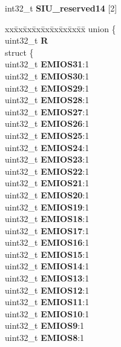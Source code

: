\begin{DoxyCompactItemize}
\begin{tabbing}
\end{tabbing}\item 
\mbox{\label{structSIU__tag_afd5b7a27271b575a1bd545b7b671dc21}} 
int32\+\_\+t {\bfseries S\+I\+U\+\_\+reserved14} \mbox{[}2\mbox{]}
\item 
\mbox{\label{structSIU__tag_aaf48f75214114a29451a5e53c22f54a5}} 
\begin{tabbing}
xx\=xx\=xx\=xx\=xx\=xx\=xx\=xx\=xx\=\kill
union \{\\
\>uint32\_t {\bfseries R}\\
\>struct \{\\
\>\>uint32\_t {\bfseries EMIOS31}:1\\
\>\>uint32\_t {\bfseries EMIOS30}:1\\
\>\>uint32\_t {\bfseries EMIOS29}:1\\
\>\>uint32\_t {\bfseries EMIOS28}:1\\
\>\>uint32\_t {\bfseries EMIOS27}:1\\
\>\>uint32\_t {\bfseries EMIOS26}:1\\
\>\>uint32\_t {\bfseries EMIOS25}:1\\
\>\>uint32\_t {\bfseries EMIOS24}:1\\
\>\>uint32\_t {\bfseries EMIOS23}:1\\
\>\>uint32\_t {\bfseries EMIOS22}:1\\
\>\>uint32\_t {\bfseries EMIOS21}:1\\
\>\>uint32\_t {\bfseries EMIOS20}:1\\
\>\>uint32\_t {\bfseries EMIOS19}:1\\
\>\>uint32\_t {\bfseries EMIOS18}:1\\
\>\>uint32\_t {\bfseries EMIOS17}:1\\
\>\>uint32\_t {\bfseries EMIOS16}:1\\
\>\>uint32\_t {\bfseries EMIOS15}:1\\
\>\>uint32\_t {\bfseries EMIOS14}:1\\
\>\>uint32\_t {\bfseries EMIOS13}:1\\
\>\>uint32\_t {\bfseries EMIOS12}:1\\
\>\>uint32\_t {\bfseries EMIOS11}:1\\
\>\>uint32\_t {\bfseries EMIOS10}:1\\
\>\>uint32\_t {\bfseries EMIOS9}:1\\
\>\>uint32\_t {\bfseries EMIOS8}:1\\

\end{tabbing}
\end{DoxyCompactItemize}
